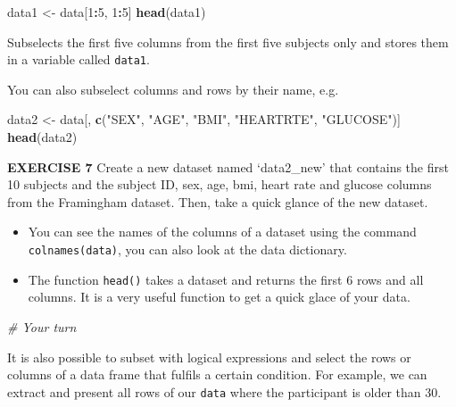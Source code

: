 \documentclass[
]{article}
\newenvironment{Shaded}{\begin{snugshade}}{\end{snugshade}}
\newcommand{\CommentTok}[1]{\textcolor[rgb]{0.56,0.35,0.01}{\textit{#1}}}
\newcommand{\DecValTok}[1]{\textcolor[rgb]{0.00,0.00,0.81}{#1}}
\newcommand{\KeywordTok}[1]{\textcolor[rgb]{0.13,0.29,0.53}{\textbf{#1}}}
\newcommand{\NormalTok}[1]{#1}
\newcommand{\OperatorTok}[1]{\textcolor[rgb]{0.81,0.36,0.00}{\textbf{#1}}}
\newcommand{\StringTok}[1]{\textcolor[rgb]{0.31,0.60,0.02}{#1}}
\begin{document}
\begin{Shaded}
\begin{Highlighting}[]
\NormalTok{data1 <-}\StringTok{ }\NormalTok{data[}\DecValTok{1}\OperatorTok{:}\DecValTok{5}\NormalTok{, }\DecValTok{1}\OperatorTok{:}\DecValTok{5}\NormalTok{]}
\KeywordTok{head}\NormalTok{(data1)}
\end{Highlighting}
\end{Shaded}

Subselects the first five columns from the first five subjects only and
stores them in a variable called \texttt{data1}.

You can also subselect columns and rows by their name, e.g.

\begin{Shaded}
\begin{Highlighting}[]
\NormalTok{data2 <-}\StringTok{ }\NormalTok{data[, }\KeywordTok{c}\NormalTok{(}\StringTok{"SEX"}\NormalTok{, }\StringTok{"AGE"}\NormalTok{, }\StringTok{"BMI"}\NormalTok{, }\StringTok{"HEARTRTE"}\NormalTok{, }\StringTok{"GLUCOSE"}\NormalTok{)]}
\KeywordTok{head}\NormalTok{(data2)}
\end{Highlighting}
\end{Shaded}

\textbf{EXERCISE 7} Create a new dataset named `data2\_new' that
contains the first 10 subjects and the subject ID, sex, age, bmi, heart
rate and glucose columns from the Framingham dataset. Then, take a quick
glance of the new dataset.

\begin{itemize}
\item
  You can see the names of the columns of a dataset using the command
  \texttt{colnames(data)}, you can also look at the data dictionary.
\item
  The function \texttt{head()} takes a dataset and returns the first 6
  rows and all columns. It is a very useful function to get a quick
  glace of your data.
\end{itemize}

\begin{Shaded}
\begin{Highlighting}[]
\CommentTok{# Your turn}
\end{Highlighting}
\end{Shaded}

It is also possible to subset with logical expressions and select the
rows or columns of a data frame that fulfils a certain condition. For
example, we can extract and present all rows of our \texttt{data} where
the participant is older than 30.
\end{document}
